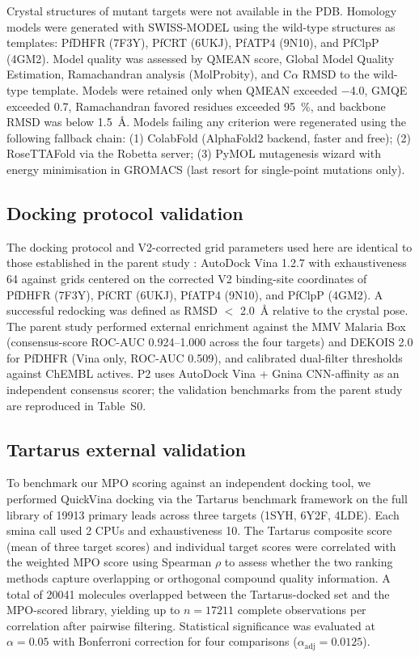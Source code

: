 \documentclass[11pt,a4paper]{article}
\begin{document}
Crystal structures of mutant targets were not available in the PDB. Homology models were generated with SWISS-MODEL using the wild-type structures as templates: PfDHFR (7F3Y), PfCRT (6UKJ), PfATP4 (9N10), and PfClpP (4GM2). Model quality was assessed by QMEAN score, Global Model Quality Estimation, Ramachandran analysis (MolProbity), and C$\alpha$ RMSD to the wild-type template. Models were retained only when QMEAN exceeded $-$4.0, GMQE exceeded 0.7, Ramachandran favored residues exceeded \qty{95}{\percent}, and backbone RMSD was below \SI{1.5}{\angstrom}. Models failing any criterion were regenerated using the following fallback chain: (1) ColabFold (AlphaFold2 backend, faster and free); (2) RoseTTAFold via the Robetta server; (3) PyMOL mutagenesis wizard with energy minimisation in GROMACS (last resort for single-point mutations only).

\subsection{Docking protocol validation}

The docking protocol and V2-corrected grid parameters used here are identical to those established in the parent study \citep{temgoua2026antimalarial}: AutoDock Vina 1.2.7 with exhaustiveness 64 against grids centered on the corrected V2 binding-site coordinates of PfDHFR (7F3Y), PfCRT (6UKJ), PfATP4 (9N10), and PfClpP (4GM2). A successful redocking was defined as RMSD $<$ \SI{2.0}{\angstrom} relative to the crystal pose. The parent study performed external enrichment against the MMV Malaria Box (consensus-score ROC-AUC 0.924--1.000 across the four targets) and DEKOIS 2.0 for PfDHFR (Vina only, ROC-AUC 0.509), and calibrated dual-filter thresholds against ChEMBL actives. P2 uses AutoDock Vina + Gnina CNN-affinity as an independent consensus scorer; the validation benchmarks from the parent study are reproduced in Table~S0.

\subsection{Tartarus external validation}

To benchmark our MPO scoring against an independent docking tool, we performed QuickVina docking via the Tartarus benchmark framework \citep{tartarus_2024} on the full library of \num{19913} primary leads across three targets (1SYH, 6Y2F, 4LDE). Each smina call used \num{2} CPUs and exhaustiveness \num{10}. The Tartarus composite score (mean of three target scores) and individual target scores were correlated with the weighted MPO score using Spearman $\rho$ to assess whether the two ranking methods capture overlapping or orthogonal compound quality information. A total of \num{20041} molecules overlapped between the Tartarus-docked set and the MPO-scored library, yielding up to $n = \num{17211}$ complete observations per correlation after pairwise filtering. Statistical significance was evaluated at $\alpha = 0.05$ with Bonferroni correction for four comparisons ($\alpha_{\text{adj}} = 0.0125$).
\end{document}
